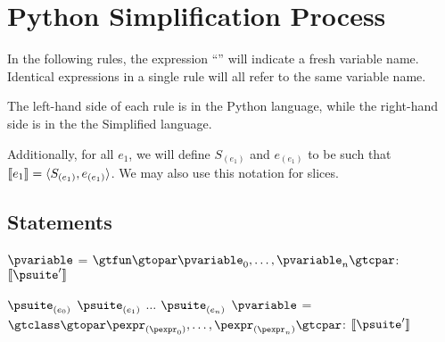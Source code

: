 \documentclass{article}
\begin{document}
\section{Python Simplification Process}

In the following rules, the expression ``\tfreshvar'' will indicate a fresh variable name.
Identical expressions in a single rule will all refer to the same variable name.

The left-hand side of each rule is in the Python language, while the right-hand side is
in the the Simplified language.

Additionally, for all $e_1$, we will define $S_{(e_1)}$ and $e_{(e_1)}$ to be such
that $\meaningof{e_1} = \gsLR{S_{(e_1)}, e_{(e_1)}}$. We may also use this notation
for slices.

\subsection{Statements}

\begin{mathpar}
\end{mathpar}

\newsavebox{\funcDefBox}
\begin{lrbox}{\funcDefBox}
\begin{python}
$\pvariable$ = $\gtfun \gtopar \pvariable_0, \ldots, \pvariable_n \gtcpar$:
  $\meaningof{\psuite'}$
\end{python}
\end{lrbox}

\begin{mathpar}
\end{mathpar}

\newsavebox{\classDefBox}
\begin{lrbox}{\classDefBox}
\begin{python}
$\psuite_{(e_0)}$
$\psuite_{(e_1  )}$
$\ldots$
$\psuite_{(e_n)}$
$\pvariable$ = $\gtclass \gtopar \pexpr_{(\pexpr_0)}, \ldots, \pexpr_{(\pexpr_n)} \gtcpar$:
  $\meaningof{\psuite'}$
\end{python}
\end{lrbox}
\end{document}
